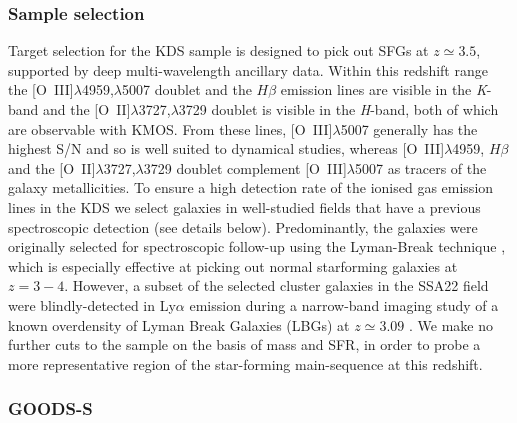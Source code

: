 \documentclass[fleqn,usenatbib]{mn2e}
\begin{document}
\subsubsection{Sample selection}\label{subsubsec:sample_selection}
Target selection for the KDS sample is designed to pick out SFGs at $z\simeq3.5$, supported by deep multi-wavelength ancillary data.
Within this redshift range the [O~{\sc III}]$\lambda$4959,$\lambda$5007 doublet and the $H\beta$ emission lines are visible in the {\it K}-band and the [O~{\sc II}]$\lambda$3727,$\lambda$3729 doublet is visible in the {\it H}-band, both of which are observable with KMOS.
From these lines, [O~{\sc III}]$\lambda$5007 generally has the highest S/N and so is well suited to dynamical studies, whereas [O~{\sc III}]$\lambda$4959, $H\beta$ and the [O~{\sc II}]$\lambda$3727,$\lambda$3729 doublet complement [O~{\sc III}]$\lambda$5007 as tracers of the galaxy metallicities. 
To ensure a high detection rate of the ionised gas emission lines in the KDS we select galaxies in well-studied fields that have a previous spectroscopic detection (see details below).
Predominantly, the galaxies were originally selected for spectroscopic follow-up using the Lyman-Break technique \citep{Steidel1996}, which is especially effective at picking out normal starforming galaxies at $z = 3-4$.
However, a subset of the selected cluster galaxies in the SSA22 field were blindly-detected in Ly$\alpha$ emission during a narrow-band imaging study of a known overdensity of Lyman Break Galaxies (LBGs) at $z\simeq3.09$ \citep{Steidel2000}.
We make no further cuts to the sample on the basis of mass and SFR, in order to probe a more representative region of the star-forming main-sequence at this redshift.

\subsubsection{GOODS-S}\label{subsubsec:sample_selection_goods}
\end{document}
